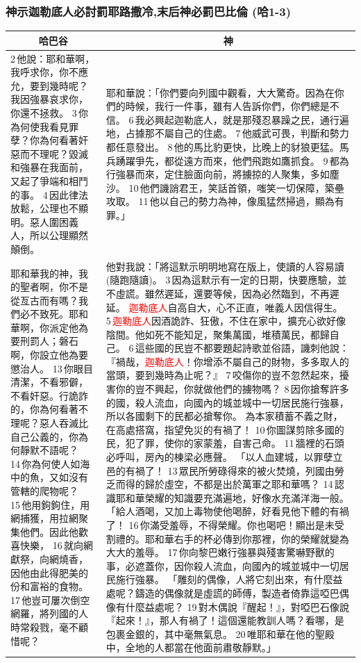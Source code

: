 \subsubsection{神示迦勒底人必討罰耶路撒冷,末后神必罰巴比倫 (哈1-3)}
\begin{table}[H]
\centering
\begin{tabular}{p{}|p{11.5cm}}\hline\hline
\multicolumn{1}{c|}{哈巴谷}&\multicolumn{1}{c}{神}\\\hline
2 他說：耶和華啊，我呼求你，你不應允，要到幾時呢？我因強暴哀求你，你還不拯救。 3 你為何使我看見罪孽？你為何看著奸惡而不理呢？毀滅和強暴在我面前，又起了爭端和相鬥的事。 4 因此律法放鬆，公理也不顯明。惡人圍困義人，所以公理顯然顛倒。
&耶和華說：「你們要向列國中觀看，大大驚奇。因為在你們的時候，我行一件事，雖有人告訴你們，你們總是不信。 6 我必興起迦勒底人，就是那殘忍暴躁之民，通行遍地，占據那不屬自己的住處。 7 他威武可畏，判斷和勢力都任意發出。 8 他的馬比豹更快，比晚上的豺狼更猛。馬兵踴躍爭先，都從遠方而來，他們飛跑如鷹抓食。 9 都為行強暴而來，定住臉面向前，將擄掠的人聚集，多如塵沙。 10 他們譏誚君王，笑話首領，嗤笑一切保障，築壘攻取。 11 他以自己的勢力為神，像風猛然掃過，顯為有罪。」\\\hline
耶和華我的神，我的聖者啊，你不是從亙古而有嗎？我們必不致死。耶和華啊，你派定他為要刑罰人；磐石啊，你設立他為要懲治人。 13 你眼目清潔，不看邪僻，不看奸惡。行詭詐的，你為何看著不理呢？惡人吞滅比自己公義的，你為何靜默不語呢？ 14 你為何使人如海中的魚，又如沒有管轄的爬物呢？ 15 他用鉤鉤住，用網捕獲，用拉網聚集他們。因此他歡喜快樂， 16 就向網獻祭，向網燒香，因他由此得肥美的份和富裕的食物。 17 他豈可屢次倒空網羅，將列國的人時常殺戮，毫不顧惜呢？
&他對我說：「將這默示明明地寫在版上，使讀的人容易讀(隨跑隨讀)。 3 因為這默示有一定的日期，快要應驗，並不虛謊。雖然遲延，還要等候，因為必然臨到，不再遲延。
\textcolor{red}{迦勒底人}自高自大，心不正直，唯義人因信得生。 5 \textcolor{red}{迦勒底人}因酒詭詐、狂傲，不住在家中，擴充心欲好像陰間。他如死不能知足，聚集萬國，堆積萬民，都歸自己。 6 這些國的民豈不都要題起詩歌並俗語，譏刺他說：『禍哉，\textcolor{red}{迦勒底人}！你增添不屬自己的財物，多多取人的當頭，要到幾時為止呢？』 7 咬傷你的豈不忽然起來，擾害你的豈不興起，你就做他們的擄物嗎？ 8 因你搶奪許多的國，殺人流血，向國內的城並城中一切居民施行強暴，所以各國剩下的民都必搶奪你。
為本家積蓄不義之財，在高處搭窩，指望免災的有禍了！ 10 你圖謀剪除多國的民，犯了罪，使你的家蒙羞，自害己命。 11 牆裡的石頭必呼叫，房內的棟梁必應聲。
「以人血建城，以罪孽立邑的有禍了！ 13 眾民所勞碌得來的被火焚燒，列國由勞乏而得的歸於虛空，不都是出於萬軍之耶和華嗎？ 14 認識耶和華榮耀的知識要充滿遍地，好像水充滿洋海一般。
「給人酒喝，又加上毒物使他喝醉，好看見他下體的有禍了！ 16 你滿受羞辱，不得榮耀。你也喝吧！顯出是未受割禮的。耶和華右手的杯必傳到你那裡，你的榮耀就變為大大的羞辱。 17 你向黎巴嫩行強暴與殘害驚嚇野獸的事，必遮蓋你，因你殺人流血，向國內的城並城中一切居民施行強暴。
「雕刻的偶像，人將它刻出來，有什麼益處呢？鑄造的偶像就是虛謊的師傅，製造者倚靠這啞巴偶像有什麼益處呢？ 19 對木偶說『醒起！』，對啞巴石像說『起來！』，那人有禍了！這個還能教訓人嗎？看哪，是包裹金銀的，其中毫無氣息。 20 唯耶和華在他的聖殿中，全地的人都當在他面前肅敬靜默。」
\\\hline
\end{tabular}
\end{table}


